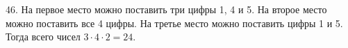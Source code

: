 46. На первое место можно поставить три цифры 1, 4 и 5. На второе место можно поставить все 4 цифры. На третье место можно поставить цифры 1 и 5. Тогда всего чисел $3\cdot4\cdot2=24.$\\
